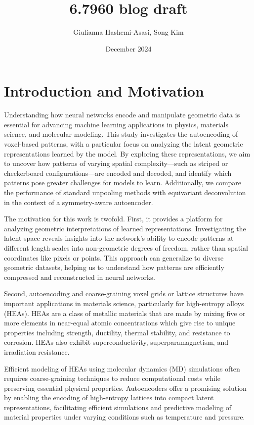\documentclass[letterpaper]{article}
\title{6.7960 blog draft}
\author{Giulianna Hashemi-Asasi, Song Kim}
\date{December 2024}
\begin{document}
\maketitle

\section{Introduction and Motivation}
Understanding how neural networks encode and manipulate geometric data is essential for advancing machine learning applications in physics, materials science, and molecular modeling. This study investigates the autoencoding of voxel-based patterns, with a particular focus on analyzing the latent geometric representations learned by the model. By exploring these representations, we aim to uncover how patterns of varying spatial complexity—such as striped or checkerboard configurations—are encoded and decoded, and identify which patterns pose greater challenges for models to learn. Additionally, we compare the performance of standard unpooling methods with equivariant deconvolution in the context of a symmetry-aware autoencoder.

The motivation for this work is twofold. First, it provides a platform for analyzing geometric interpretations of learned representations. Investigating the latent space reveals insights into the network's ability to encode patterns at different length scales into non-geometric degrees of freedom, rather than spatial coordinates like pixels or points. This approach can generalize to diverse geometric datasets, helping us to understand how patterns are efficiently compressed and reconstructed in neural networks.

Second, autoencoding and coarse-graining voxel grids or lattice structures have important applications in materials science, particularly for high-entropy alloys (HEAs). 
HEAs are a class of metallic materials that are made by mixing five or more elements in near-equal atomic concentrations which give rise to unique properties including strength, ductility, thermal stability, and resistance to corrosion. HEAs also exhibit superconductivity, superparamagnetism, and irradiation resistance.

Efficient modeling of HEAs using molecular dynamics (MD) simulations often requires coarse-graining techniques to reduce computational costs while preserving essential physical properties. Autoencoders offer a promising solution by enabling the encoding of high-entropy lattices into compact latent representations, facilitating efficient simulations and predictive modeling of material properties under varying conditions such as temperature and pressure.
\end{document}
